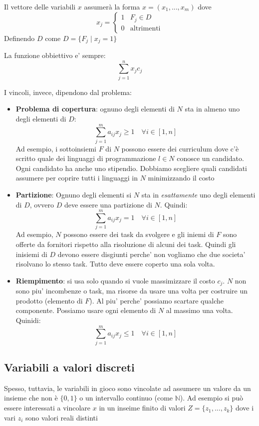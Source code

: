 Il vettore delle variabili $ x $ assumerà la forma $ x = (x_1,...,x_m) $ dove
\[
  x_j = \begin{cases}
  1 & F_j \in D\\
  0 & \text{altrimenti}
  \end{cases}
\]
Definendo $D$ come $D = \{F_j \mid x_j = 1\}$

La funzione obbiettivo e' sempre:
\[
\sum_{j=1}^{n} x_j c_j
\]

I vincoli, invece, dipendono dal problema:
\begin{itemize}
\item \textbf{Problema di copertura}: ognuno degli elementi di $N$ sta in almeno uno degli elementi di $ D $:
    \[
      \sum_{j=1}^{m} a_{ij}x_j \geq 1 \quad \forall i \in [1,n]
    \]
   Ad esempio, i sottoinsiemi $ F $ di $ N $ possono essere dei curriculum dove c'è scritto quale dei linguaggi di programmazione $ l \in N $ conosce un candidato. Ogni candidato ha anche uno stipendio. Dobbiamo scegliere quali candidati assumere per coprire tutti i linguaggi in $ N $ minimizzando il costo
  \item \textbf{Partizione}: Ognuno degli elementi si $N$ sta in \textit{esattamente} uno degli elementi di $D$, ovvero $D$ deve essere una partizione di $ N $. Quindi:
    \[
    \sum_{j=1}^{m} a_{ij}x_j = 1 \quad \forall i \in [1,n]
    \]
    Ad esempio, $ N $ possono essere dei task da svolgere e gli iniemi di $ F $ sono offerte da fornitori rispetto alla risoluzione di alcuni dei task. Quindi gli inisiemi di $ D $ devono essere disgiunti perche' non vogliamo che due societa' risolvano lo stesso task. Tutto deve essere coperto una sola volta.

  \item \textbf{Riempimento}: si usa solo quando si vuole massimizzare il costo $c_j$. $ N $ non sono piu' incombenze o task, ma risorse da usare una volta per costruire un prodotto (elemento di $ F $). Al piu' perche' possiamo scartare qualche componente. Possiamo usare ogni elemento di $ N $ al massimo una volta. Quinidi:
  \[
    \sum^m_{j=1} a_{ij}x_j \leq 1 \quad \forall i\in [1,n]
  \]
\end{itemize}
\subsection{Variabili a valori discreti}
Spesso, tuttavia, le variabili in gioco sono vincolate ad assumere un valore da un insieme che non è $\{0,1\}$ o un intervallo continuo (come $\mathbb{N}$). Ad esempio si può essere interessati a vincolare $x$ in un inseime finito di valori $Z = \{z_1,...,z_k\}$ dove i vari $z_i$ sono valori reali distinti 

